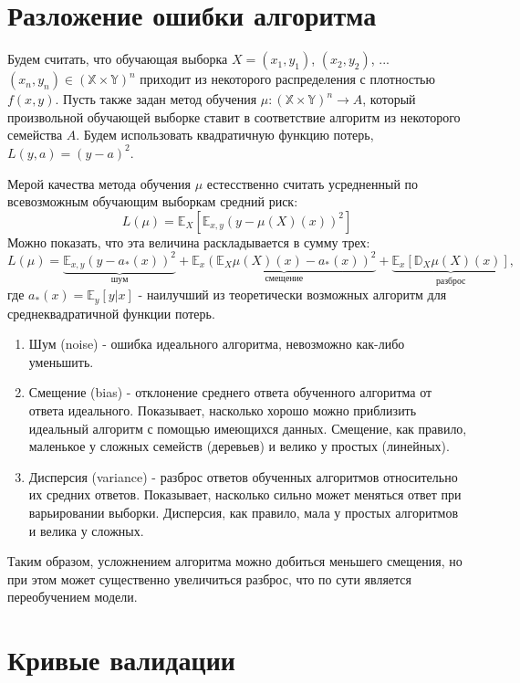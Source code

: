 \section{Разложение ошибки алгоритма}

Будем считать, что обучающая выборка $X = (x_1, y_1)$, $(x_2, y_2)$, ... $(x_n, y_n) \in (\mathbb{X}\times\mathbb{Y})^n$ приходит из некоторого распределения с плотностью $f(x, y)$. Пусть также задан метод обучения $\mu: (\mathbb{X}\times\mathbb{Y})^n \rightarrow A$, который произвольной обучающей выборке ставит в соответствие алгоритм из некоторого семейства $A$. Будем использовать квадратичную функцию потерь, $L(y, a) = (y - a)^2$.

Мерой качества метода обучения $\mu$ естесственно считать усредненный по всевозможным обучающим выборкам средний риск:
$$
L(\mu) = \mathbb{E}_X\left[\mathbb{E}_{x,y}\left(y - \mu(X)(x)\right)^2 \right]
$$
Можно показать, что эта величина раскладывается в сумму трех:
$$
L(\mu) = \underbrace{\mathbb{E}_{x,y}\left(y - a_{*}(x)\right)^2}_\text{шум} +
         \underbrace{\mathbb{E}_x\left(\mathbb{E}_X\mu(X)(x) - a_{*}(x)\right)^2}_\text{смещение} +
         \underbrace{\mathbb{E}_x\left[\mathbb{D}_X\mu(X)(x)\right]}_\text{разброс},
$$
где $a_{*}(x) = \mathbb{E}_y\left[y|x\right]$ - наилучший из теоретически возможных алгоритм для среднеквадратичной функции потерь. 

\begin{enumerate}
    \item Шум (noise) - ошибка идеального алгоритма, невозможно как-либо уменьшить.
    \item Смещение (bias) - отклонение среднего ответа обученного алгоритма от ответа идеального. Показывает, насколько хорошо можно приблизить идеальный алгоритм с помощью имеющихся данных. Смещение, как правило, маленькое у сложных семейств (деревьев) и велико у простых (линейных).
    \item Дисперсия (variance) - разброс ответов обученных алгоритмов относительно их средних ответов. Показывает, насколько сильно может меняться ответ при варьировании выборки. Дисперсия, как правило, мала у простых алгоритмов и велика у сложных.
\end{enumerate}

Таким образом, усложнением алгоритма можно добиться меньшего смещения, но при этом может существенно увеличиться разброс, что по сути является переобучением модели.


\section{Кривые валидации}


